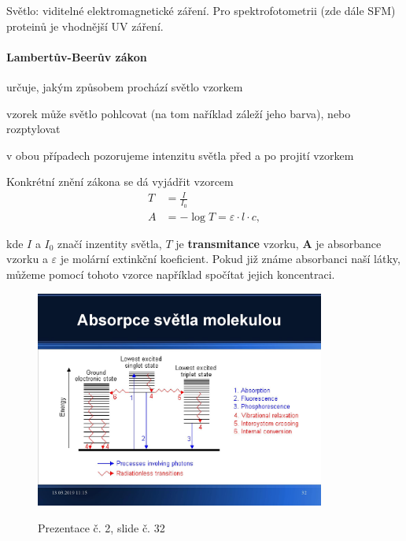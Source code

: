 \documentclass[DIV=8]{scrreprt}
\begin{document}
Světlo: viditelné elektromagnetické záření. Pro spektrofotometrii (zde dále SFM) proteinů je vhodnější UV záření.

\paragraph{Lambertův-Beerův zákon}
\begin{myItemize}[nosep]
    \item určuje, jakým způsobem prochází světlo vzorkem
    \item vzorek může světlo pohlcovat (na tom naříklad záleží jeho barva), nebo rozptylovat
\begin{myItemize}[nosep]
    \item v obou případech pozorujeme intenzitu světla před a po projití vzorkem
\end{myItemize}

\end{myItemize}



Konkrétní znění zákona se dá vyjádřit vzorcem
\begin{align*}T &= \frac{I}{I_0} \\
A &= -\log T = \varepsilon \cdot l \cdot c,\end{align*}

kde \(I\) a \(I_0\) značí inzentity světla, \(T\) je \textbf{transmitance} vzorku, \textbf{A} je absorbance vzorku a \(\varepsilon\) je molární extinkční koeficient. Pokud již známe absorbanci naší látky, můžeme pomocí tohoto vzorce například spočítat jejich koncentraci.

\begin{figure}
    \caption{Prezentace č. 2, slide č. 32}
    \includegraphics[width=0.85\textwidth]{slides-2/slide-32.jpg}
    \centering
    \label{slides-2-slide-32}
\end{figure}
\end{document}
